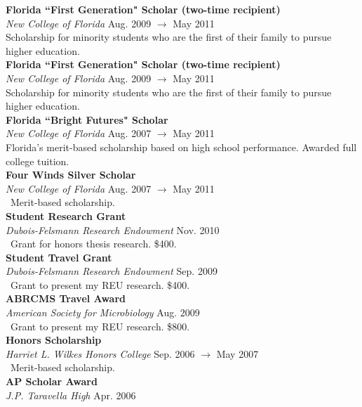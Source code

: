 \documentclass[a4paper,12pt]{article}
\newcommand{\ressubheading}[4]{
        \textbf{#1} \hfill #2\\
        \textit{#3} \hfill #4 \\}
\begin{document}
    \ressubheading{Florida ``First Generation" Scholar {\normalfont(two-time recipient)}}{}{New College of Florida}{Aug. 2009 $\rightarrow$ May 2011}
    Scholarship for minority students who are the first of their family to pursue higher education.\\ %


    \ressubheading{Florida ``First Generation" Scholar {\normalfont(two-time recipient)}}{}{New College of Florida}{Aug. 2009 $\rightarrow$ May 2011}
    Scholarship for minority students who are the first of their family to pursue higher education.\\

    \ressubheading{Florida ``Bright Futures" Scholar}{}{New College of Florida}{Aug. 2007 $\rightarrow$ May 2011}
    Florida's merit-based scholarship based on high school performance. Awarded full college tuition. \\

    \ressubheading{Four Winds Silver Scholar}{}{New College of Florida}{Aug. 2007 $\rightarrow$ May 2011}\
    Merit-based scholarship.\\
    
    
    \ressubheading{Student Research Grant}{}{Dubois-Felsmann Research Endowment}{Nov. 2010}\
    Grant for honors thesis research. \$400.\\
    
    \ressubheading{Student Travel Grant}{}{Dubois-Felsmann Research Endowment}{Sep. 2009}\
    Grant to present my REU research. \$400.\\
    
    \ressubheading{ABRCMS Travel Award}{}{American Society for Microbiology}{Aug. 2009}\
    Grant to present my REU research. \$800.\\
    
    \ressubheading{Honors Scholarship}{}{Harriet L. Wilkes Honors College}{Sep. 2006 $\rightarrow$ May 2007}\
    Merit-based scholarship.\\
    
    \ressubheading{AP Scholar Award}{}{J.P. Taravella High}{Apr. 2006}
\end{document}
